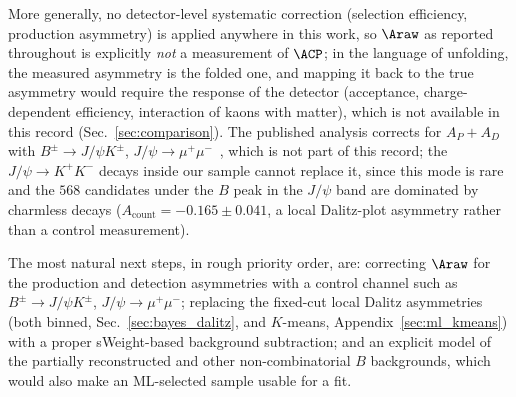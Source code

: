 More generally, no detector-level systematic correction (selection efficiency, production asymmetry) is applied anywhere in this work, so $\Araw$ as reported throughout is explicitly \emph{not} a measurement of $\ACP$; in the language of unfolding, the measured asymmetry is the folded one, and mapping it back to the true asymmetry would require the response of the detector (acceptance, charge-dependent efficiency, interaction of kaons with matter), which is not available in this record (Sec.~\ref{sec:comparison}). The published analysis corrects for $A_P+A_D$ with $B^\pm\to J/\psi K^\pm$, $J/\psi\to\mu^+\mu^-$~\cite{lhcb_cpv_prd2023}, which is not part of this record; the $J/\psi\to K^+K^-$ decays inside our sample cannot replace it, since this mode is rare and the $568$ candidates under the $B$ peak in the $J/\psi$ band are dominated by charmless decays ($A_{\mathrm{count}}=-0.165\pm0.041$, a local Dalitz-plot asymmetry rather than a control measurement).

The most natural next steps, in rough priority order, are: correcting $\Araw$ for the production and detection asymmetries with a control channel such as $B^\pm\to J/\psi K^\pm$, $J/\psi\to\mu^+\mu^-$; replacing the fixed-cut local Dalitz asymmetries (both binned, Sec.~\ref{sec:bayes_dalitz}, and $K$-means, Appendix~\ref{sec:ml_kmeans}) with a proper sWeight-based background subtraction; and an explicit model of the partially reconstructed and other non-combinatorial $B$ backgrounds, which would also make an ML-selected sample usable for a fit.

\FloatBarrier



